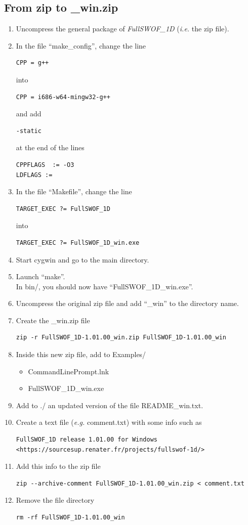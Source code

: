 \documentclass[a4paper, 11pt]{article}
\newcommand{\FullSWOFoneD}{\emph{FullSWOF\_1D}}
\begin{document}
\subsection{From zip to \_win.zip}
\begin{enumerate}
\item Uncompress the general package of \FullSWOFoneD{} (\emph{i.e.} the zip file).
\item In the file ``make\_config'', change the line
\begin{verbatim}
CPP = g++
\end{verbatim}
into
\begin{verbatim}
CPP = i686-w64-mingw32-g++
\end{verbatim}
and add
\begin{verbatim}
-static
\end{verbatim}
at the end of the lines
\begin{verbatim}
CPPFLAGS  := -O3
LDFLAGS :=
\end{verbatim}
\item In the file ``Makefile'', change the line
\begin{verbatim}
TARGET_EXEC ?= FullSWOF_1D
\end{verbatim}
into
\begin{verbatim}
TARGET_EXEC ?= FullSWOF_1D_win.exe
\end{verbatim}
\item Start cygwin and go to the main directory.
\item Launch ``make''.\\
In bin/, you should now have ``FullSWOF\_1D\_win.exe''.
\item Uncompress the original zip file and add ``\_win'' to the directory name.
\item Create the \_win.zip file
\begin{verbatim}
zip -r FullSWOF_1D-1.01.00_win.zip FullSWOF_1D-1.01.00_win
\end{verbatim}
\item Inside this new zip file, add to Examples/
	\begin{itemize}
		\item CommandLinePrompt.lnk
		\item FullSWOF\_1D\_win.exe
	\end{itemize}
\item Add to ./ an updated version of the file README\_win.txt.
\item Create a text file (\emph{e.g.} comment.txt) with some info such as
\begin{verbatim}
FullSWOF_1D release 1.01.00 for Windows
<https://sourcesup.renater.fr/projects/fullswof-1d/>
\end{verbatim}
\item Add this info to the zip file
\begin{verbatim}
zip --archive-comment FullSWOF_1D-1.01.00_win.zip < comment.txt
\end{verbatim}
\item Remove the file directory
\begin{verbatim}
rm -rf FullSWOF_1D-1.01.00_win
\end{verbatim}


\end{enumerate}
\end{document}

